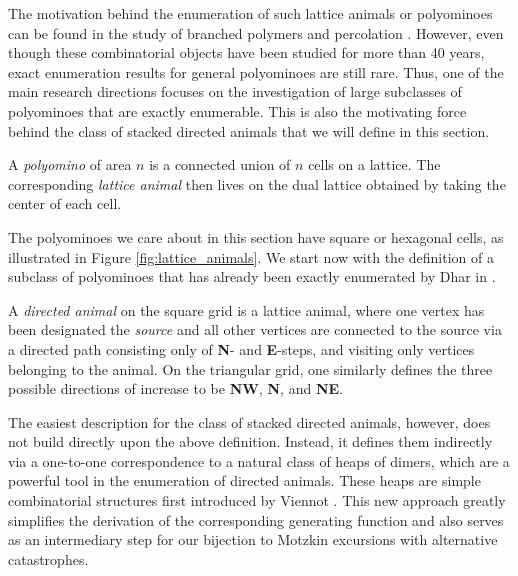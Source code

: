 The motivation behind the enumeration of such lattice animals or polyominoes can be found in the study of branched polymers \cite{Polymers} and percolation \cite{Percolation}. 
However, even though these combinatorial objects have been studied for more than 40 years, exact enumeration results for general polyominoes are still rare. 
Thus, one of the main research directions focuses on the investigation of large subclasses of polyominoes that are exactly enumerable. 
This is also the motivating force behind the class of stacked directed animals that we will define in this section.

\begin{definition}\label{def:lattice_animals}
  A \textit{polyomino} of area $n$ is a connected union of $n$ cells on a lattice. 
  The corresponding \textit{lattice animal} then lives on the dual lattice obtained by taking the center of each cell.
\end{definition}

The polyominoes we care about in this section have square or hexagonal cells, as illustrated in Figure \ref{fig:lattice_animals}. 
We start now with the definition of a subclass of polyominoes that has already been exactly enumerated by Dhar in \cite{DirectedAnimals}.

\begin{definition}
  A \textit{directed animal} on the square grid is a lattice animal, where one vertex has been designated the \textit{source} and all other vertices are connected to the source via a directed path consisting only of \textbf{N}- and \textbf{E}-steps, and visiting only vertices belonging to the animal.
  On the triangular grid, one similarly defines the three possible directions of increase to be \textbf{NW}, \textbf{N}, and \textbf{NE}.
\end{definition}

The easiest description for the class of stacked directed animals, however, does not build directly upon the above definition. 
Instead, it defines them indirectly via a one-to-one correspondence to a natural class of heaps of dimers, which are a powerful tool in the enumeration of directed animals. 
These heaps are simple combinatorial structures first introduced by Viennot \cite{Heaps}. 
This new approach greatly simplifies the derivation of the corresponding generating function and also serves as an intermediary step for our bijection to Motzkin excursions with alternative catastrophes.

